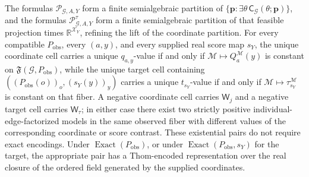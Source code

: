 The formulas \(\mathscr P_{\mathcal G,A,Y}\) form a finite semialgebraic partition of \(\{\mathbf p:\exists\theta\,\mathsf C_{\mathcal G}(\theta;\mathbf p)\}\), and the formulas \(\mathscr P^{\tau}_{\mathcal G,A,Y}\) form a finite semialgebraic partition of that feasible projection times \(\mathbb R^{\mathcal X_Y}\), refining the lift of the coordinate partition. For every compatible \(P_{\mathrm{obs}}\), every \((a,y)\), and every supplied real score map \(s_Y\), the unique coordinate cell carries a unique \(q_{a,y}\)-value if and only if \(\mathcal M\mapsto Q_a^{\mathcal M}(y)\) is constant on \(\mathfrak F(\mathcal G,P_{\mathrm{obs}})\), while the unique target cell containing \(((P_{\mathrm{obs}}(o))_o,(s_Y(y))_y)\) carries a unique \(t_{s_Y}\)-value if and only if \(\mathcal M\mapsto\tau_{s_Y}^{\mathcal M}\) is constant on that fiber. A negative coordinate cell carries \(\mathsf W_j\) and a negative target cell carries \(\mathsf W_{\tau}\); in either case there exist two strictly positive individual-edge-factorized models in the same observed fiber with different values of the corresponding coordinate or score contrast. These existential pairs do not require exact encodings. Under \(\operatorname{Exact}(P_{\mathrm{obs}})\), or under \(\operatorname{Exact}(P_{\mathrm{obs}},s_Y)\) for the target, the appropriate pair has a Thom-encoded representation over the real closure of the ordered field generated by the supplied coordinates.